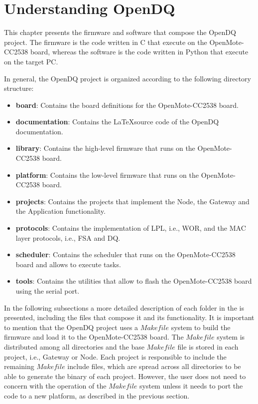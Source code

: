 \chapter{Understanding OpenDQ}
\label{lab:05-software}
This chapter presents the firmware and software that compose the OpenDQ project. The firmware is the code written in C that execute on the OpenMote-CC2538 board, whereas the software is the code written in Python that execute on the target PC.

In general, the OpenDQ project is organized according to the following directory structure:
\begin{itemize}
\item \textbf{board}: Contains the board definitions for the OpenMote-CC2538 board.
\item \textbf{documentation}: Contains the \LaTeX source code of the OpenDQ documentation.
\item \textbf{library}: Contains the high-level firmware that runs on the OpenMote-CC2538 board.
\item \textbf{platform}: Contains the low-level firmware that runs on the OpenMote-CC2538 board.
\item \textbf{projects}: Contains the projects that implement the Node, the Gateway and the Application functionality.
\item \textbf{protocols}: Contains the implementation of LPL, i.e., WOR, and the MAC layer protocols, i.e., FSA and DQ.
\item \textbf{scheduler}: Contains the scheduler that runs on the OpenMote-CC2538 board and allows to execute tasks.
\item \textbf{tools}: Contains the utilities that allow to flash the OpenMote-CC2538 board using the serial port.
\end{itemize}

In the following subsections a more detailed description of each folder in the is presented, including the files that compose it and its functionality. It is important to mention that the OpenDQ project uses a $Makefile$ system to build the firmware and load it to the OpenMote-CC2538 board. The $Makefile$ system is distributed among all directories and the base $Makefile$ file is stored in each project, i.e., Gateway or Node. Each project is responsible to include the remaining $Makefile$ include files, which are spread across all directories to be able to generate the binary of each project. However, the user does not need to concern with the operation of the $Makefile$ system unless it needs to port the code to a new platform, as described in the previous section.

